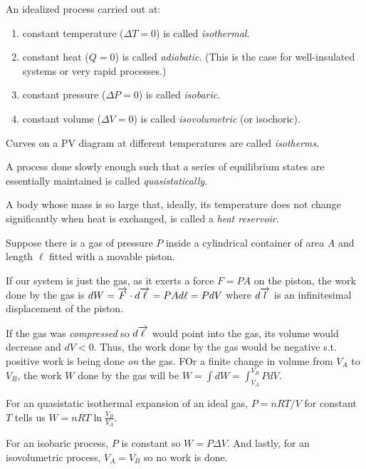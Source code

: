 \begin{definition}
    An idealized process carried out at:
    \begin{enumerate}
        \item constant temperature ($\Delta T = 0$) is called \emph{isothermal}.
        \item constant heat ($Q = 0$) is called \emph{adiabatic}. (This is the case for well-insulated systems or very rapid processes.)
        \item constant pressure ($\Delta P = 0$) is called \emph{isobaric}.
        \item constant volume ($\Delta V = 0$) is called \emph{isovolumetric} (or isochoric).
    \end{enumerate}
\end{definition}
\begin{definition}[Isotherms]
    Curves on a PV diagram at different temperatures are called \emph{isotherms}.
\end{definition}
\begin{definition}[Quasistatically]
    A process done slowly enough such that a series of equilibrium states are essentially maintained is called \emph{quasistatically}.
\end{definition}
\begin{definition}
    A body whose mass is so large that, ideally, its temperature does not change significantly when heat is exchanged, is called a \emph{heat reservoir}.
\end{definition}
\begin{example}
    Suppose there is a gas of pressure $P$ inside a cylindrical container of area $A$ and length $\ell$ fitted with a movable piston.

    If our system is just the gas, as it exerts a force $F=PA$ on the piston, the work done by the gas is $dW = \overrightarrow{F}\cdot d\overrightarrow{\ell} = PAd\ell = PdV$ where $d\overrightarrow{l}$ is an infinitesimal displacement of the piston.

    If the gas was \emph{compressed} so $d\overrightarrow{\ell}$ would point into the gas, its volume would decrease and $dV<0$. Thus, the work done by the gas would be negative s.t. positive work is being done \emph{on} the gas. FOr a finite change in volume from $V_A$ to $V_B$, the work $W$ done by the gas will be $W = \int dW = \int_{V_A}^{V_B}PdV$.

    For an quasistatic isothermal expansion of an ideal gas, $P=nRT/V$ for constant $T$ tells us $W = nRT\ln\frac{V_B}{V_A}.$

    For an isobaric process, $P$ is constant so $W = P\Delta V$. And lastly, for an isovolumetric process, $V_A = V_B$ so no work is done. 
\end{example}
